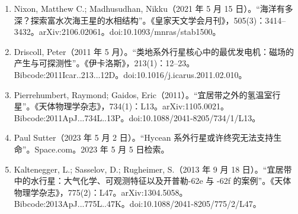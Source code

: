 \begin{enumerate}
\item Nixon, Matthew C.; Madhusudhan, Nikku（2021 年 5 月 15 日）。“海洋有多深？探索富水次海王星的水相结构”。《皇家天文学会月刊》，505(3)：3414–3432。arXiv:2106.02061。doi:10.1093/mnras/stab1500。
\item Driscoll, Peter（2011 年 5 月）。“类地系外行星核心中的最优发电机：磁场的产生与可探测性”。《伊卡洛斯》，213(1)：12–23。Bibcode:2011Icar..213...12D。doi:10.1016/j.icarus.2011.02.010。
\item Pierrehumbert, Raymond; Gaidos, Eric（2011）。“宜居带之外的氢温室行星”。《天体物理学杂志》，734(1)：L13。arXiv:1105.0021。Bibcode:2011ApJ...734L..13P。doi:10.1088/2041-8205/734/1/L13。
\item Paul Sutter（2023 年 5 月 2 日）。“Hycean 系外行星或许终究无法支持生命”。Space.com。2023 年 5 月 5 日检索。
\item Kaltenegger, L.; Sasselov, D.; Rugheimer, S.（2013 年 9 月 18 日）。“宜居带中的水行星：大气化学、可观测特征以及开普勒-62e 与 -62f 的案例”。《天体物理学杂志》，775(2)：L47。arXiv:1304.5058。Bibcode:2013ApJ...775L..47K。doi:10.1088/2041-8205/775/2/L47。

\end{enumerate}